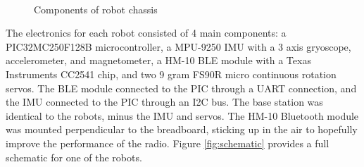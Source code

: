 \documentclass[]{article}
\begin{document}
\begin{figure}
  \centering
  \\
  \caption{Components of robot chassis}
  \label{fig:robotchassis}
\end{figure}

The electronics for each robot consisted of 4 main components: a PIC32MC250F128B microcontroller, a MPU-9250 IMU with a 3 axis gryoscope, accelerometer, and magnetometer, a HM-10 BLE module with a Texas Instruments CC2541 chip, and two 9 gram FS90R micro continuous rotation servos.
The BLE module connected to the PIC through a UART connection, and the IMU connected to the PIC through an I2C bus.
The base station was identical to the robots, minus the IMU and servos.
The HM-10 Bluetooth module was mounted perpendicular to the breadboard, sticking up in the air to hopefully improve the performance of the radio. Figure \ref{fig:schematic} provides a full schematic for one of the robots.
\end{document}
